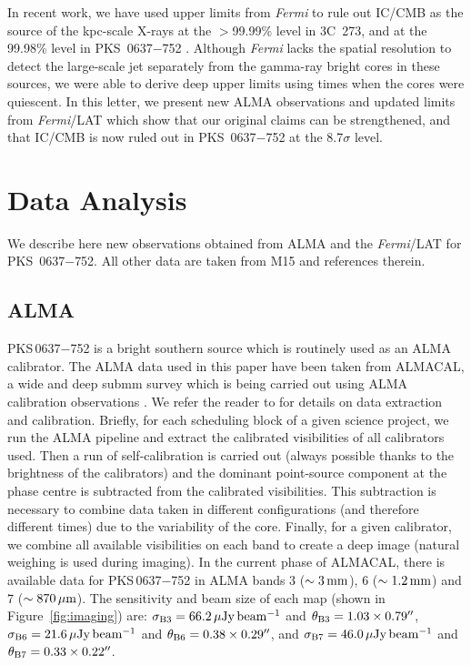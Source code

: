 \documentclass[twocolumn]{aastex61}
\begin{document}
In recent work, we have used upper limits from \emph{Fermi} to rule
out IC/CMB as the source of the kpc-scale X-rays at the $>$99.99\%
level in 3C~273, and at the 99.98\% level in PKS~0637$-$752
\citep[][hereafter M15]{meyer2014,meyer2015}. Although \emph{Fermi}
lacks the spatial resolution to detect the large-scale jet separately
from the gamma-ray bright cores in these sources, we were able to
derive deep upper limits using times when the cores were quiescent.
In this letter, we present new ALMA observations and updated limits
from \emph{Fermi}/LAT which show that our original claims can be
strengthened, and that IC/CMB is now ruled out in PKS~0637$-$752 at
the 8.7$\sigma$ level.

\section{Data Analysis}
We describe here new observations obtained from ALMA and the \emph{Fermi}/LAT for PKS~0637$-$752. All other data are taken from M15 and references therein.  
\subsection{ALMA}

PKS\,0637$-$752 is a bright southern source which is routinely used as
an ALMA calibrator. The ALMA data used in this paper have been taken
from ALMACAL, a wide and deep submm survey which is being carried out
using ALMA calibration observations \citep{Oteo2016a,Oteo2016b}. We
refer the reader to \cite{Oteo2016a} for details on data extraction
and calibration. Briefly, for each scheduling block of a given science
project, we run the ALMA pipeline and extract the calibrated
visibilities of all calibrators used. Then a run of self-calibration
is carried out (always possible thanks to the brightness of the
calibrators) and the dominant point-source component at the phase
centre is subtracted from the calibrated visibilities. This
subtraction is necessary to combine data taken in different
configurations (and therefore different times) due to the variability
of the core.  Finally, for a given calibrator, we combine all
available visibilities on each band to create a deep image (natural
weighing is used during imaging). In the current phase of ALMACAL,
there is available data for PKS\,0637$-$752 in ALMA bands 3 ($\sim
3\,{\rm mm}$), 6 ($\sim 1.2 \, {\rm mm}$) and 7 ($\sim 870 \, {\rm \mu
  m}$). The sensitivity and beam size of each map (shown in
Figure~\ref{fig:imaging}) are: $\sigma_{\rm B3} = 66.2 \, {\rm \mu Jy
  \, beam^{-1}}$ and $\theta_{\rm B3} = 1.03 \times 0.79''$,
$\sigma_{\rm B6} = 21.6 \, {\rm \mu Jy \, beam^{-1}}$ and $\theta_{\rm
  B6} = 0.38 \times 0.29''$, and $\sigma_{\rm B7} = 46.0 \, {\rm \mu
  Jy \, beam^{-1}}$ and $\theta_{\rm B7} = 0.33 \times 0.22''$.
\end{document}
